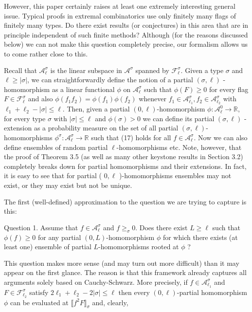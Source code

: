 \documentclass[10pt]{article}
\begin{document}
However, this paper certainly raises at least one extremely interesting general issue. Typical proofs in extremal combinatorics use only finitely many flags of finitely many types. Do there exist results (or conjectures) in this area that are in principle independent of such finite methods? Although (for the reasons discussed below) we can not make this question completely precise, our formalism allows us to come rather close to this.

Recall that $\mathcal{A}_{\ell}^{\sigma}$ is the linear subspace in $\mathcal{A}^{\sigma}$ spanned by $\mathcal{F}_{\ell}^{\sigma}$. Given a type $\sigma$ and $\ell \geq|\sigma|$, we can straightforwardly define the notion of a partial $(\sigma, \ell)$ -homomorphism as a linear functional $\phi$ on $\mathcal{A}_{\ell}^{\sigma}$ such that $\phi(F) \geq 0$ for every flag $F \in \mathcal{F}_{\ell}^{\sigma}$ and also $\phi\left(f_{1} f_{2}\right)=\phi\left(f_{1}\right) \phi\left(f_{2}\right)$ whenever $f_{1} \in \mathcal{A}_{\ell_{1}}^{\sigma}, f_{2} \in \mathcal{A}_{\ell_{2}}^{\sigma}$ with $\ell_{1}+\ell_{2}-|\sigma| \leq \ell$. Then, given a partial $(0, \ell)$-homomorphism $\phi: \mathcal{A}_{\ell}^{0} \longrightarrow \mathbb{R}$,\\
for every type $\sigma$ with $|\sigma| \leq \ell$ and $\phi(\sigma)>0$ we can define its partial $(\sigma, \ell)$ -extension as a probability measure on the set of all partial $(\sigma, \ell)$-homomorphisms $\phi^{\sigma}: \mathcal{A}_{\ell}^{\sigma} \longrightarrow \mathbb{R}$ such that (17) holds for all $f \in \mathcal{A}_{\ell}^{\sigma}$. Now we can also define ensembles of random partial $\ell$-homomorphisms etc. Note, however, that the proof of Theorem 3.5 (as well as many other keystone results in Section 3.2) completely breaks down for partial homomorphisms and their extensions. In fact, it is easy to see that for partial ( $0, \ell$ )-homomorphisms ensembles may not exist, or they may exist but not be unique.

The first (well-defined) approximation to the question we are trying to capture is this:

Question 1. Assume that $f \in \mathcal{A}_{\ell}^{\sigma}$ and $f \geq_{\sigma} 0$. Does there exist $L \geq \ell$ such that $\phi(f) \geq 0$ for any partial $(0, L)$-homomorphism $\phi$ for which there exists (at least one) ensemble of partial $L$-homomorphisms rooted at $\phi$ ?

This question makes more sense (and may turn out more difficult) than it may appear on the first glance. The reason is that this framework already captures all arguments solely based on Cauchy-Schwarz. More precisely, if $f \in \mathcal{A}_{\ell_{1}}^{\sigma}$ and $F \in \mathcal{F}_{\ell_{2}}^{\sigma}$ satisfy $2 \ell_{1}+\ell_{2}-2|\sigma| \leq \ell$ then every $(0, \ell)$-partial homomorphism $\phi$ can be evaluated at $\llbracket f^{2} F \rrbracket_{\sigma}$ and, clearly,
\end{document}
